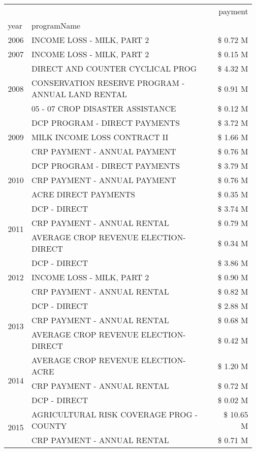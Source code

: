 \begin{tabular}{llr}
\toprule
 &  & payment \\
year & programName &  \\
\midrule
2006 & INCOME LOSS - MILK, PART 2 & \$ 0.72 M \\
\cline{1-3}
2007 & INCOME LOSS - MILK, PART 2 & \$ 0.15 M \\
\cline{1-3}
\multirow[t]{3}{*}{2008} & DIRECT AND COUNTER CYCLICAL PROG & \$ 4.32 M \\
 & CONSERVATION RESERVE PROGRAM - ANNUAL LAND RENTAL & \$ 0.91 M \\
 & 05 - 07 CROP DISASTER ASSISTANCE & \$ 0.12 M \\
\cline{1-3}
\multirow[t]{3}{*}{2009} & DCP PROGRAM - DIRECT PAYMENTS & \$ 3.72 M \\
 & MILK INCOME LOSS CONTRACT II & \$ 1.66 M \\
 & CRP PAYMENT - ANNUAL PAYMENT & \$ 0.76 M \\
\cline{1-3}
\multirow[t]{3}{*}{2010} & DCP PROGRAM - DIRECT PAYMENTS & \$ 3.79 M \\
 & CRP PAYMENT - ANNUAL PAYMENT & \$ 0.76 M \\
 & ACRE DIRECT PAYMENTS & \$ 0.35 M \\
\cline{1-3}
\multirow[t]{3}{*}{2011} & DCP - DIRECT & \$ 3.74 M \\
 & CRP PAYMENT - ANNUAL RENTAL & \$ 0.79 M \\
 & AVERAGE CROP REVENUE ELECTION-DIRECT & \$ 0.34 M \\
\cline{1-3}
\multirow[t]{3}{*}{2012} & DCP - DIRECT & \$ 3.86 M \\
 & INCOME LOSS - MILK, PART 2 & \$ 0.90 M \\
 & CRP PAYMENT - ANNUAL RENTAL & \$ 0.82 M \\
\cline{1-3}
\multirow[t]{3}{*}{2013} & DCP - DIRECT & \$ 2.88 M \\
 & CRP PAYMENT - ANNUAL RENTAL & \$ 0.68 M \\
 & AVERAGE CROP REVENUE ELECTION-DIRECT & \$ 0.42 M \\
\cline{1-3}
\multirow[t]{3}{*}{2014} & AVERAGE CROP REVENUE ELECTION-ACRE & \$ 1.20 M \\
 & CRP PAYMENT - ANNUAL RENTAL & \$ 0.72 M \\
 & DCP - DIRECT & \$ 0.02 M \\
\cline{1-3}
\multirow[t]{3}{*}{2015} & AGRICULTURAL RISK COVERAGE PROG - COUNTY & \$ 10.65 M \\
 & CRP PAYMENT - ANNUAL RENTAL & \$ 0.71 M \\

\end{tabular}
